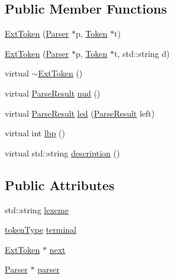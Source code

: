 \subsection*{Public Member Functions}
\begin{DoxyCompactItemize}
\item 
\hyperlink{classExtToken_a45a27528f391faf5679b7b30563ce846}{Ext\-Token} (\hyperlink{classParser}{Parser} $\ast$p, \hyperlink{classToken}{Token} $\ast$t)
\item 
\hyperlink{classExtToken_afa8972152abec42cd52b6f6f70a9a179}{Ext\-Token} (\hyperlink{classParser}{Parser} $\ast$p, \hyperlink{classToken}{Token} $\ast$t, std\-::string d)
\item 
virtual \hyperlink{classExtToken_a20af764e16aad213816429272d96a918}{$\sim$\-Ext\-Token} ()
\item 
virtual \hyperlink{classParseResult}{Parse\-Result} \hyperlink{classExtToken_a5c21a5ffe91f212085259126652ab77c}{nud} ()
\item 
virtual \hyperlink{classParseResult}{Parse\-Result} \hyperlink{classExtToken_afb2c9b0040e198d1d8aa2e041c5a7211}{led} (\hyperlink{classParseResult}{Parse\-Result} left)
\item 
virtual int \hyperlink{classExtToken_a6c0d61faa058b71147dd54bacee1db94}{lbp} ()
\item 
virtual std\-::string \hyperlink{classExtToken_a4ab6e72ac23235650b1756f794172ebb}{description} ()
\end{DoxyCompactItemize}
\subsection*{Public Attributes}
\begin{DoxyCompactItemize}
\item 
std\-::string \hyperlink{classExtToken_a5af1643a542ef7ee8ca0f82706383ae3}{lexeme}
\item 
\hyperlink{scanner_8h_ab7f9b765cab7ed98e5a7f05690f6a061}{token\-Type} \hyperlink{classExtToken_abbdaef42b65403cdc0247839ef95c875}{terminal}
\item 
\hyperlink{classExtToken}{Ext\-Token} $\ast$ \hyperlink{classExtToken_aa02995a897183b2a6ef758e541534e46}{next}
\item 
\hyperlink{classParser}{Parser} $\ast$ \hyperlink{classExtToken_af70d22156d5f8e855a8b0d92a82706ba}{parser}
\end{DoxyCompactItemize}


